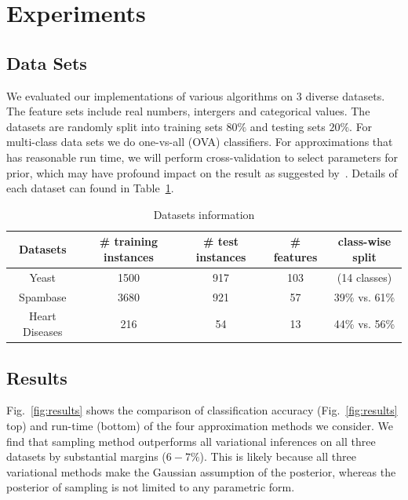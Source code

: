 \section{Experiments}
\label{sec:experiments}

\subsection{Data Sets}

We evaluated our implementations of various algorithms on 3 diverse datasets. The feature sets include real numbers, intergers and categorical values. The datasets are randomly split into training sets $80\%$ and
testing sets $20\%$. For multi-class data sets we do one-vs-all (OVA)
classifiers. For approximations that has reasonable run time, we will perform
cross-validation to select parameters for prior, which may have profound
impact on the result as suggested by~\cite{Asuncion2009smoothing}. Details of each dataset can found in Table~\ref{tb:datasets}.

\begin{table}
\begin{center}
\begin{tabular}{| c | c |  c | c | c |}
  \hline
  Datasets & \# training instances & \# test instances & \# features & class-wise split\\
  \hline
  Yeast & 1500 & 917 & 103 & (14 classes) \\
  \hline
  Spambase & 3680 & 921 & 57 & 39\% vs. 61\% \\
  \hline
  Heart Diseases & 216 & 54 & 13 & 44\% vs. 56\% \\
  \hline
\end{tabular}
\end{center}

\caption{Datasets information}
\label{tb:datasets}
\end{table}

\subsection{Results}

Fig.~\ref{fig:results} shows the comparison of classification accuracy
(Fig.~\ref{fig:results} top) and run-time (bottom) of the four approximation
methods we consider. We find that sampling method outperforms all variational
inferences on all three datasets by substantial margins ($6-7\%$). This is
likely because all three variational methods make the Gaussian assumption of
the posterior, whereas the posterior of sampling is not limited to any
parametric form. 

